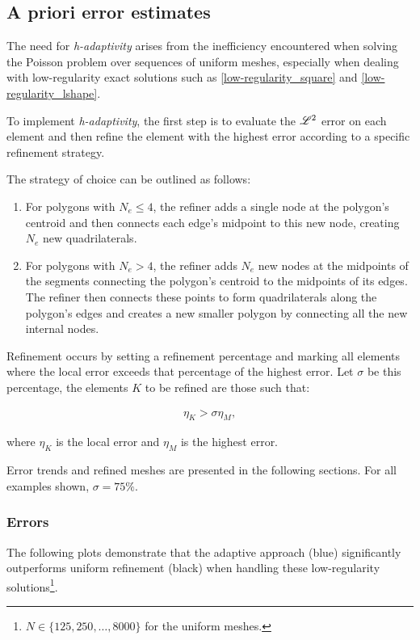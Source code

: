 \subsection{A priori error estimates}

The need for \textit{h-adaptivity} arises from the inefficiency encountered when solving the Poisson problem over sequences of uniform meshes, especially when dealing with low-regularity exact solutions such as \eqref{low-regularity_square} and \eqref{low-regularity_lshape}.

To implement \textit{h-adaptivity}, the first step is to evaluate the $\mathscr{L}^2$ error on each element and then refine the element with the highest error according to a specific refinement strategy.

The strategy of choice can be outlined as follows:

\begin{enumerate}
    \item For polygons with $N_e \leq 4$, the refiner adds a single node at the polygon's centroid and then connects each edge's midpoint to this new node, creating $N_e$ new quadrilaterals.
    \item For polygons with $N_e > 4$, the refiner adds $N_e$ new nodes at the midpoints of the segments connecting the polygon's centroid to the midpoints of its edges. The refiner then connects these points to form quadrilaterals along the polygon's edges and creates a new smaller polygon by connecting all the new internal nodes.
\end{enumerate}

Refinement occurs by setting a refinement percentage and marking all elements where the local error exceeds that percentage of the highest error. Let $\sigma$ be this percentage, the elements $K$ to be refined are those such that:

\begin{gather}
	\eta_K > \sigma \eta_{M},
\end{gather}

where $\eta_K$ is the local error and $\eta_M$ is the highest error.

Error trends and refined meshes are presented in the following sections. For all examples shown, $\sigma = 75\%$.

\newpage
\subsubsection{Errors}

The following plots demonstrate that the adaptive approach (blue) significantly outperforms uniform refinement (black) when handling these low-regularity solutions\footnote{$N \in \{125, 250, \dots, 8000\}$ for the uniform meshes.}.

